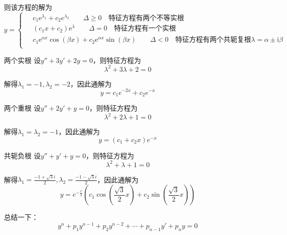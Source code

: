 \documentclass[math]{amznotes}
\begin{document}
则该方程的解为
\begin{equation*}
  y = \left\{
    \begin{aligned}
      \;&c_1 \mathrm{e}^{\lambda_1} + c_2 e^{\lambda_2} \qquad \Delta \ge 0 \quad\text{特征方程有两个不等实根}\\
      &(c_1x + c_2) \mathrm{e}^{\lambda} \qquad \Delta = 0 \quad \text{特征方程有一个实根}\\
      &c_1 \mathrm{e}^{\alpha x} \cos(\beta x) + c_2 \mathrm{e}^{\alpha x} \sin(\beta x) \qquad \Delta < 0 \quad \text{特征方程有两个共轭复根}\lambda = \alpha \pm \mathrm{i}\beta\\
    \end{aligned}
  \right.
\end{equation*}
\begin{exbox}{两个实根}{}
    设$y'' + 3y' + 2y = 0$，则特征方程为
    \begin{equation*}
        \lambda^2 + 3\lambda + 2 = 0
    \end{equation*}

    解得$\lambda_1 = -1, \lambda_2 = -2$，因此通解为
    \begin{equation*}
        y = c_1 e^{-2x} + c_2 e^{-x}
    \end{equation*}
\end{exbox}
\begin{exbox}{两个重根}{}
    设$y'' + 2y' + y = 0$，则特征方程为
    \begin{equation*}
        \lambda^2 + 2\lambda + 1 = 0
    \end{equation*}

    解得$\lambda_1 = \lambda_2 = -1$，因此通解为
    \begin{equation*}
        y = (c_1 + c_2 x) e^{-x}
    \end{equation*}
\end{exbox}
\begin{exbox}{共轭负根}{}
    设$y'' + y' + y = 0$，则特征方程为
    \begin{equation*}
        \lambda^2 + \lambda + 1 = 0
    \end{equation*}

    解得$\lambda_1 = \frac{-1 + \sqrt{3}i}{2}, \lambda_2 = \frac{-1 - \sqrt{3}i}{2}$，因此通解为
    \begin{equation*}
        y = e^{-\frac{x}{2}}(c_1 \cos(\frac{\sqrt{3}}{2}x) + c_2 \sin(\frac{\sqrt{3}}{2}x))
    \end{equation*}
\end{exbox}
总结一下：
\begin{equation*}
  y^n + p_1 y^{n-1} + p_2 y^{n-2} + \cdots + p_{n-1} y' + p_n y = 0
\end{equation*}
\end{document}
